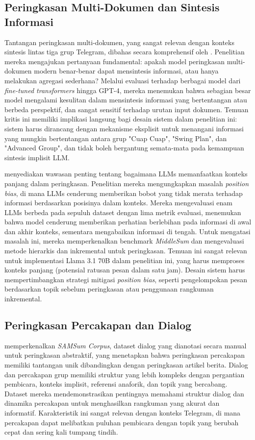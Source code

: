 \subsection{Peringkasan Multi-Dokumen dan Sintesis Informasi}

Tantangan peringkasan multi-dokumen, yang sangat relevan dengan konteks sintesis lintas tiga grup Telegram, dibahas secara komprehensif oleh \textcite{deyoung2024}. Penelitian mereka mengajukan pertanyaan fundamental: apakah model peringkasan multi-dokumen modern benar-benar dapat mensintesis informasi, atau hanya melakukan agregasi sederhana? Melalui evaluasi terhadap berbagai model dari \textit{fine-tuned transformers} hingga GPT-4, mereka menemukan bahwa sebagian besar model mengalami kesulitan dalam mensintesis informasi yang bertentangan atau berbeda perspektif, dan sangat sensitif terhadap urutan input dokumen. Temuan kritis ini memiliki implikasi langsung bagi desain sistem dalam penelitian ini: sistem harus dirancang dengan mekanisme eksplisit untuk menangani informasi yang mungkin bertentangan antara grup "Cuap Cuap", "Swing Plan", dan "Advanced Group", dan tidak boleh bergantung semata-mata pada kemampuan sintesis implisit LLM.

\textcite{ravaut2024} menyediakan wawasan penting tentang bagaimana LLMs memanfaatkan konteks panjang dalam peringkasan. Penelitian mereka mengungkapkan masalah \textit{position bias}, di mana LLMs cenderung memberikan bobot yang tidak merata terhadap informasi berdasarkan posisinya dalam konteks. Mereka mengevaluasi enam LLMs berbeda pada sepuluh dataset dengan lima metrik evaluasi, menemukan bahwa model cenderung memberikan perhatian berlebihan pada informasi di awal dan akhir konteks, sementara mengabaikan informasi di tengah. Untuk mengatasi masalah ini, mereka memperkenalkan benchmark \textit{MiddleSum} dan mengevaluasi metode hierarkis dan inkremental untuk peringkasan. Temuan ini sangat relevan untuk implementasi Llama 3.1 70B dalam penelitian ini, yang harus memproses konteks panjang (potensial ratusan pesan dalam satu jam). Desain sistem harus mempertimbangkan strategi mitigasi \textit{position bias}, seperti pengelompokan pesan berdasarkan topik sebelum peringkasan atau penggunaan rangkuman inkremental.

\subsection{Peringkasan Percakapan dan Dialog}

\textcite{gliwa2019} memperkenalkan \textit{SAMSum Corpus}, dataset dialog yang dianotasi secara manual untuk peringkasan abstraktif, yang menetapkan bahwa peringkasan percakapan memiliki tantangan unik dibandingkan dengan peringkasan artikel berita. Dialog dan percakapan grup memiliki struktur yang lebih kompleks dengan pergantian pembicara, konteks implisit, referensi anaforik, dan topik yang bercabang. Dataset mereka mendemonstrasikan pentingnya memahami struktur dialog dan dinamika percakapan untuk menghasilkan rangkuman yang akurat dan informatif. Karakteristik ini sangat relevan dengan konteks Telegram, di mana percakapan dapat melibatkan puluhan pembicara dengan topik yang berubah cepat dan sering kali tumpang tindih.

